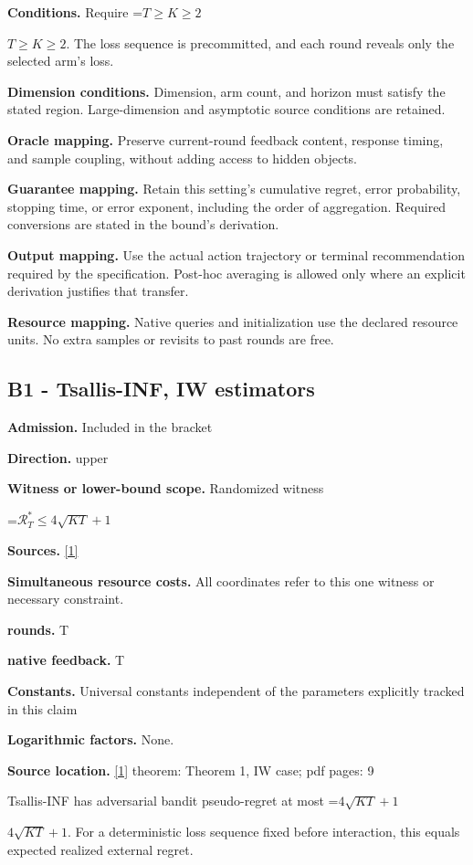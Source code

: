 \documentclass[10pt,a4paper]{article}
\newcommand{\AtlasMath}[1]{\par\begingroup\centering\setbox0=\hbox{$\displaystyle #1$}\ifdim\wd0>1.4\linewidth\typeout{ATLAS WIDE FORMULA: \the\wd0}\fi\ifdim\wd0>\linewidth\resizebox{\linewidth}{!}{\box0}\else\box0\fi\par\endgroup}
\newcommand{\AtlasInlineMath}[1]{\begingroup\setbox0=\hbox{$#1$}\ifdim\wd0>.4\linewidth\endgroup\AtlasMath{#1}\else\endgroup$#1$\fi}
\begin{document}
\textbf{Conditions.} Require \AtlasInlineMath{T\ge K\ge2}. The loss sequence is precommitted, and each round reveals only the selected arm’s loss.

\textbf{Dimension conditions.} Dimension, arm count, and horizon must satisfy the stated region. Large-dimension and asymptotic source conditions are retained.

\textbf{Oracle mapping.} Preserve current-round feedback content, response timing, and sample coupling, without adding access to hidden objects.

\textbf{Guarantee mapping.} Retain this setting's cumulative regret, error probability, stopping time, or error exponent, including the order of aggregation. Required conversions are stated in the bound's derivation.

\textbf{Output mapping.} Use the actual action trajectory or terminal recommendation required by the specification. Post-hoc averaging is allowed only where an explicit derivation justifies that transfer.

\textbf{Resource mapping.} Native queries and initialization use the declared resource units. No extra samples or revisits to past rounds are free.

\subsection{B1 - Tsallis-INF, IW estimators}
\textbf{Admission.} Included in the bracket

\textbf{Direction.} upper

\textbf{Witness or lower-bound scope.} Randomized witness

\AtlasMath{\mathcal{R}_T^*\le4\sqrt{KT}+1}
\textbf{Sources.} \href{https://jmlr.org/papers/volume22/19-753/19-753.pdf}{[1]}

\textbf{Simultaneous resource costs.} All coordinates refer to this one witness or necessary constraint.

\textbf{rounds.} T

\textbf{native feedback.} T

\textbf{Constants.} Universal constants independent of the parameters explicitly tracked in this claim

\textbf{Logarithmic factors.} None.

\textbf{Source location.} \href{https://jmlr.org/papers/volume22/19-753/19-753.pdf}{[1]} theorem: Theorem 1, IW case; pdf pages: 9

Tsallis-INF has adversarial bandit pseudo-regret at most \AtlasInlineMath{4\sqrt{KT}+1}. For a deterministic loss sequence fixed before interaction, this equals expected realized external regret.
\end{document}
